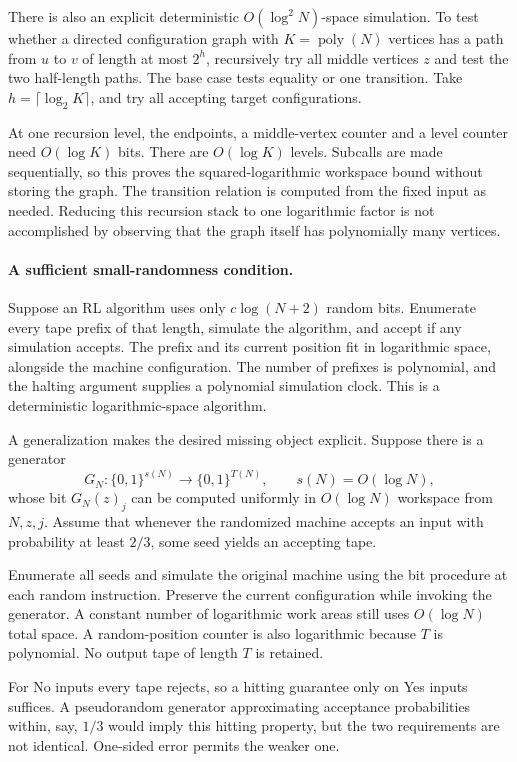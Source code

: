 \documentclass[11pt]{article}
\begin{document}
There is also an explicit deterministic $O(\log^2N)$-space simulation. To test whether a directed configuration graph with $K=\operatorname{poly}(N)$ vertices has a path from $u$ to $v$ of length at most $2^h$, recursively try all middle vertices $z$ and test the two half-length paths. The base case tests equality or one transition. Take $h=\lceil\log_2K\rceil$, and try all accepting target configurations.

At one recursion level, the endpoints, a middle-vertex counter and a level counter need $O(\log K)$ bits. There are $O(\log K)$ levels. Subcalls are made sequentially, so this proves the squared-logarithmic workspace bound without storing the graph. The transition relation is computed from the fixed input as needed. Reducing this recursion stack to one logarithmic factor is not accomplished by observing that the graph itself has polynomially many vertices.

\paragraph{A sufficient small-randomness condition.}
Suppose an RL algorithm uses only $c\log(N+2)$ random bits. Enumerate every tape prefix of that length, simulate the algorithm, and accept if any simulation accepts. The prefix and its current position fit in logarithmic space, alongside the machine configuration. The number of prefixes is polynomial, and the halting argument supplies a polynomial simulation clock. This is a deterministic logarithmic-space algorithm.

A generalization makes the desired missing object explicit. Suppose there is a generator
\[
 G_N:\{0,1\}^{s(N)}\longrightarrow\{0,1\}^{T(N)},
 \qquad s(N)=O(\log N),
\]
whose bit $G_N(z)_j$ can be computed uniformly in $O(\log N)$ workspace from $N,z,j$. Assume that whenever the randomized machine accepts an input with probability at least $2/3$, some seed yields an accepting tape.

Enumerate all seeds and simulate the original machine using the bit procedure at each random instruction. Preserve the current configuration while invoking the generator. A constant number of logarithmic work areas still uses $O(\log N)$ total space. A random-position counter is also logarithmic because $T$ is polynomial. No output tape of length $T$ is retained.

For No inputs every tape rejects, so a hitting guarantee only on Yes inputs suffices. A pseudorandom generator approximating acceptance probabilities within, say, $1/3$ would imply this hitting property, but the two requirements are not identical. One-sided error permits the weaker one.
\end{document}
